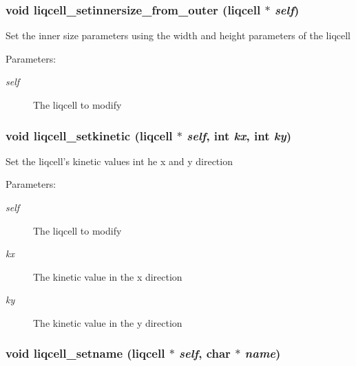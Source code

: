 \subsubsection[{liqcell\_\-setinnersize\_\-from\_\-outer}]{\setlength{\rightskip}{0pt plus 5cm}void liqcell\_\-setinnersize\_\-from\_\-outer (liqcell $\ast$ {\em self})}\label{d5/da2/liqcell_8c_016901d78dd41a1cfb4c666acaa2a204}


Set the inner size parameters using the width and height parameters of the liqcell \begin{Desc}
\item[Parameters:]
\begin{description}
\item[{\em self}]The liqcell to modify \end{description}
\end{Desc}
\subsubsection[{liqcell\_\-setkinetic}]{\setlength{\rightskip}{0pt plus 5cm}void liqcell\_\-setkinetic (liqcell $\ast$ {\em self}, \/  int {\em kx}, \/  int {\em ky})}\label{d5/da2/liqcell_8c_6823ecc48c2a4e3515bb5a4c9ceaa7d9}


Set the liqcell's kinetic values int he x and y direction \begin{Desc}
\item[Parameters:]
\begin{description}
\item[{\em self}]The liqcell to modify \item[{\em kx}]The kinetic value in the x direction \item[{\em ky}]The kinetic value in the y direction \end{description}
\end{Desc}
\subsubsection[{liqcell\_\-setname}]{\setlength{\rightskip}{0pt plus 5cm}void liqcell\_\-setname (liqcell $\ast$ {\em self}, \/  char $\ast$ {\em name})}\label{d5/da2/liqcell_8c_0c09156cc6c30c000b773a574d909f04}


